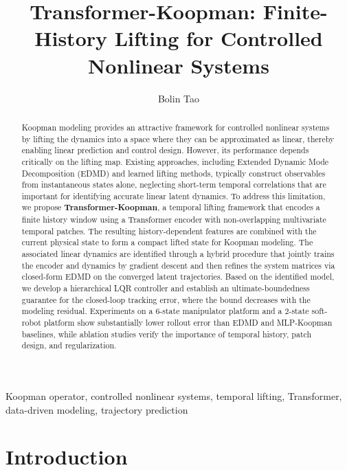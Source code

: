 \documentclass[journal]{IEEEtran}
\begin{document}
\title{Transformer-Koopman: Finite-History Lifting for Controlled Nonlinear Systems}

\author{Bolin Tao}


\maketitle

\begin{abstract}
Koopman modeling provides an attractive framework for controlled nonlinear systems by lifting the dynamics into a space where they can be approximated as linear, thereby enabling linear prediction and control design. However, its performance depends critically on the lifting map. Existing approaches, including Extended Dynamic Mode Decomposition (EDMD) and learned lifting methods, typically construct observables from instantaneous states alone, neglecting short-term temporal correlations that are important for identifying accurate linear latent dynamics. To address this limitation, we propose \textbf{Transformer-Koopman}, a temporal lifting framework that encodes a finite history window using a Transformer encoder with non-overlapping multivariate temporal patches. The resulting history-dependent features are combined with the current physical state to form a compact lifted state for Koopman modeling. The associated linear dynamics are identified through a hybrid procedure that jointly trains the encoder and dynamics by gradient descent and then refines the system matrices via closed-form EDMD on the converged latent trajectories. Based on the identified model, we develop a hierarchical LQR controller and establish an ultimate-boundedness guarantee for the closed-loop tracking error, where the bound decreases with the modeling residual. Experiments on a 6-state manipulator platform and a 2-state soft-robot platform show substantially lower rollout error than EDMD and MLP-Koopman baselines, while ablation studies verify the importance of temporal history, patch design, and regularization.
\end{abstract}




\begin{IEEEkeywords}
Koopman operator, controlled nonlinear systems, temporal lifting, Transformer, data-driven modeling, trajectory prediction
\end{IEEEkeywords}

\section{Introduction}
\label{sec:introduction}
\end{document}
